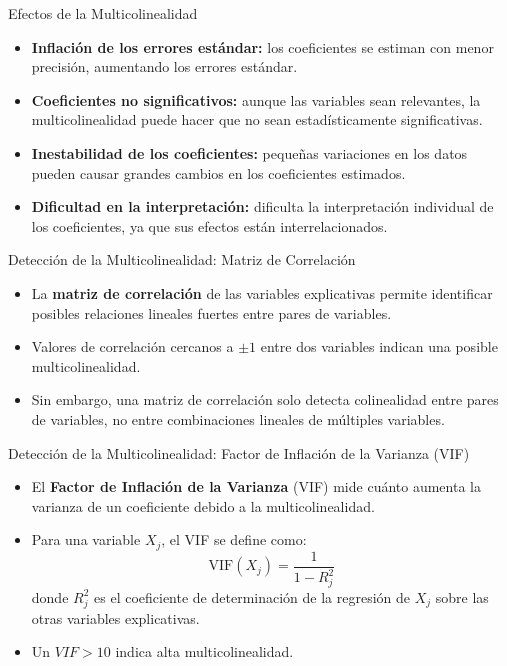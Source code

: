 \documentclass{beamer}
\begin{document}
\begin{frame}{Efectos de la Multicolinealidad}
    \begin{itemize}
        \item \textbf{Inflación de los errores estándar:} los coeficientes se estiman con menor precisión, aumentando los errores estándar.
        \item \textbf{Coeficientes no significativos:} aunque las variables sean relevantes, la multicolinealidad puede hacer que no sean estadísticamente significativas.
        \item \textbf{Inestabilidad de los coeficientes:} pequeñas variaciones en los datos pueden causar grandes cambios en los coeficientes estimados.
        \item \textbf{Dificultad en la interpretación:} dificulta la interpretación individual de los coeficientes, ya que sus efectos están interrelacionados.
    \end{itemize}
\end{frame}
\begin{frame}{Detección de la Multicolinealidad: Matriz de Correlación}
    \begin{itemize}
        \item La \textbf{matriz de correlación} de las variables explicativas permite identificar posibles relaciones lineales fuertes entre pares de variables.
        \item Valores de correlación cercanos a \(\pm 1\) entre dos variables indican una posible multicolinealidad.
        \item Sin embargo, una matriz de correlación solo detecta colinealidad entre pares de variables, no entre combinaciones lineales de múltiples variables.
    \end{itemize}
\end{frame}

\begin{frame}{Detección de la Multicolinealidad: Factor de Inflación de la Varianza (VIF)}
    \begin{itemize}
        \item El \textbf{Factor de Inflación de la Varianza} (VIF) mide cuánto aumenta la varianza de un coeficiente debido a la multicolinealidad.
        \item Para una variable \(X_j\), el VIF se define como:
        \[
        \text{VIF}(X_j) = \frac{1}{1 - R_j^2}
        \]
        donde \(R_j^2\) es el coeficiente de determinación de la regresión de \(X_j\) sobre las otras variables explicativas.
        \item Un $VIF > 10$ indica alta multicolinealidad.
    \end{itemize}
\end{frame}
\end{document}
